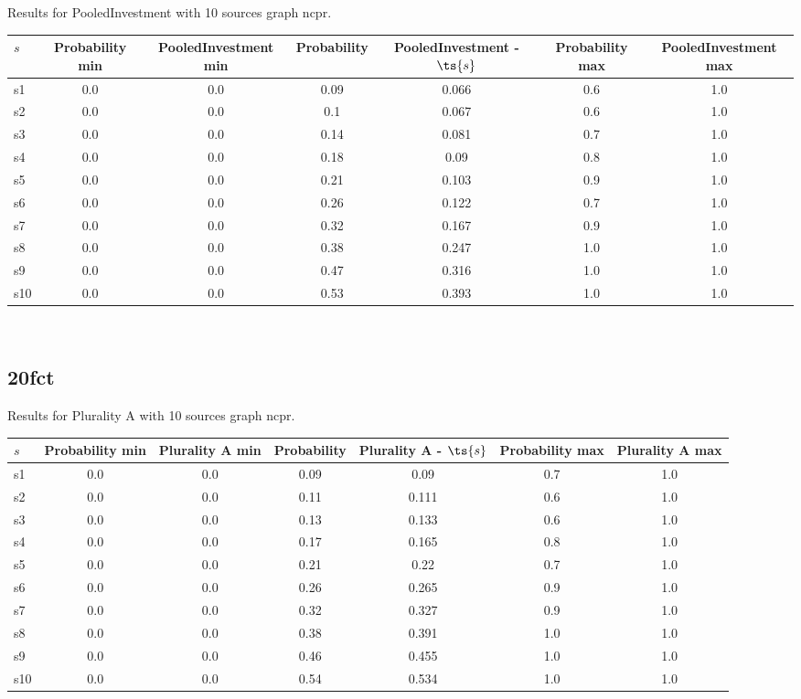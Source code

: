 \documentclass{article}
\begin{document}
\noindent Results for PooledInvestment with 10 sources graph ncpr.

\noindent\begin{tabular}{|l|c|c|c|c|c|c|}
\hline
$s$& Probability min & PooledInvestment min & Probability & PooledInvestment - $\ts{s}$ & Probability max & PooledInvestment max\\
\hline
s1 &0.0 & 0.0 & 0.09 & 0.066 & 0.6 & 1.0\\
\hline
s2 &0.0 & 0.0 & 0.1 & 0.067 & 0.6 & 1.0\\
\hline
s3 &0.0 & 0.0 & 0.14 & 0.081 & 0.7 & 1.0\\
\hline
s4 &0.0 & 0.0 & 0.18 & 0.09 & 0.8 & 1.0\\
\hline
s5 &0.0 & 0.0 & 0.21 & 0.103 & 0.9 & 1.0\\
\hline
s6 &0.0 & 0.0 & 0.26 & 0.122 & 0.7 & 1.0\\
\hline
s7 &0.0 & 0.0 & 0.32 & 0.167 & 0.9 & 1.0\\
\hline
s8 &0.0 & 0.0 & 0.38 & 0.247 & 1.0 & 1.0\\
\hline
s9 &0.0 & 0.0 & 0.47 & 0.316 & 1.0 & 1.0\\
\hline
s10 &0.0 & 0.0 & 0.53 & 0.393 & 1.0 & 1.0\\
\hline
\end{tabular}\\

\newpage

\subsection{20fct}

\noindent Results for Plurality A with 10 sources graph ncpr.

\noindent\begin{tabular}{|l|c|c|c|c|c|c|}
\hline
$s$& Probability min & Plurality A min & Probability & Plurality A - $\ts{s}$ & Probability max & Plurality A max\\
\hline
s1 &0.0 & 0.0 & 0.09 & 0.09 & 0.7 & 1.0\\
\hline
s2 &0.0 & 0.0 & 0.11 & 0.111 & 0.6 & 1.0\\
\hline
s3 &0.0 & 0.0 & 0.13 & 0.133 & 0.6 & 1.0\\
\hline
s4 &0.0 & 0.0 & 0.17 & 0.165 & 0.8 & 1.0\\
\hline
s5 &0.0 & 0.0 & 0.21 & 0.22 & 0.7 & 1.0\\
\hline
s6 &0.0 & 0.0 & 0.26 & 0.265 & 0.9 & 1.0\\
\hline
s7 &0.0 & 0.0 & 0.32 & 0.327 & 0.9 & 1.0\\
\hline
s8 &0.0 & 0.0 & 0.38 & 0.391 & 1.0 & 1.0\\
\hline
s9 &0.0 & 0.0 & 0.46 & 0.455 & 1.0 & 1.0\\
\hline
s10 &0.0 & 0.0 & 0.54 & 0.534 & 1.0 & 1.0\\
\hline
\end{tabular}\\
\end{document}
